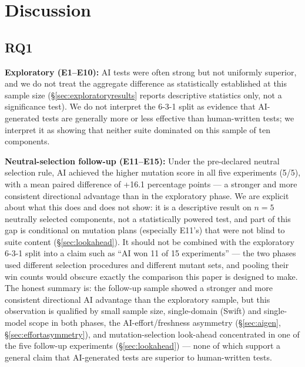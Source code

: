 \documentclass[10pt,conference]{IEEEtran}
\begin{document}
\section{Discussion}
\label{sec:discussion}

\subsection{RQ1}
\textbf{Exploratory (E1--E10):} AI tests were often strong but not uniformly superior, and we do not treat the aggregate difference as statistically established at this sample size (\S\ref{sec:exploratoryresults} reports descriptive statistics only, not a significance test). We do not interpret the 6-3-1 split as evidence that AI-generated tests are generally more or less effective than human-written tests; we interpret it as showing that neither suite dominated on this sample of ten components.

\textbf{Neutral-selection follow-up (E11--E15):} Under the pre-declared neutral selection rule, AI achieved the higher mutation score in all five experiments (5/5), with a mean paired difference of +16.1 percentage points — a stronger and more consistent directional advantage than in the exploratory phase. We are explicit about what this does and does not show: it is a descriptive result on $n=5$ neutrally selected components, not a statistically powered test, and part of this gap is conditional on mutation plans (especially E11's) that were not blind to suite content (\S\ref{sec:lookahead}). It should not be combined with the exploratory 6-3-1 split into a claim such as ``AI won 11 of 15 experiments'' — the two phases used different selection procedures and different mutant sets, and pooling their win counts would obscure exactly the comparison this paper is designed to make. The honest summary is: the follow-up sample showed a stronger and more consistent directional AI advantage than the exploratory sample, but this observation is qualified by small sample size, single-domain (Swift) and single-model scope in both phases, the AI-effort/freshness asymmetry (\S\ref{sec:aigen}, \S\ref{sec:effortasymmetry}), and mutation-selection look-ahead concentrated in one of the five follow-up experiments (\S\ref{sec:lookahead}) — none of which support a general claim that AI-generated tests are superior to human-written tests.
\end{document}
